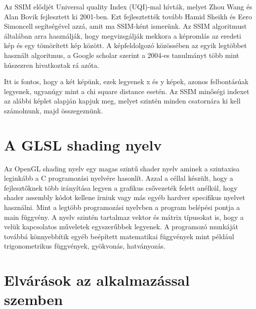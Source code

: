 Az SSIM elődjét Universal quality Index (UQI)-mal hívták, melyet Zhou Wang és Alan Bovik fejlesztett ki 2001-ben. Ezt fejlesztették tovább Hamid Sheikh és Eero Simoncell segítségével azzá, amit ma SSIM-ként ismerünk\cite{SSIM}. Az SSIM algoritmust általában arra használják, hogy megvizsgálják mekkora a képromlás az eredeti kép és egy tömörített kép között. A képfeldolgozó közössében az egyik legtöbbet használt algoritmus, a Google scholar szerint a 2004-es tanulmányt több mint húszezren hivatkoztak rá azóta.

Itt is fontos, hogy a két képünk, ezek legyenek x és y képek, azonos felbontásúak legyenek, ugyanúgy mint a chi square distance esetén. Az SSIM minőségi indexet az alábbi képlet alapján kapjuk meg, melyet szintén minden csatornára ki kell számolnunk, majd összegeznünk.

\section{A GLSL shading nyelv}
Az OpenGL shading nyelv egy magas szintű shader nyelv aminek a szintaxisa leginkább a C programozási nyelvére hasonlít. Azzal a céllal készült, hogy a fejlesztőknek több irányítása legyen a grafikus csővezeték felett anélkúl, hogy shader assembly kódot kellene írniuk vagy más egyéb hardver specifikus nyelvet használni. Mint a legtöbb programozási nyelvben a program belépési pontja a main függvény. A nyelv szintén tartalmaz vektor és mátrix típusokat is, hogy a velük kapcsolatos műveletek egyszerűbbek legyenek. A programozó munkáját továbbá könnyebbítik egyéb beépített matematikai függvények mint például trigonometrikus függvények, gyökvonás, hatványozás.

\section{Elvárások az alkalmazással szemben}

